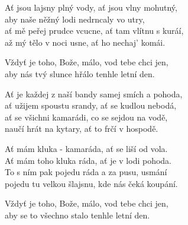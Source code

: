 
\ve{}
Ať jsou lajsny plný vody, ať jsou vlny mohutný,\\
aby naše něžný lodi nedrncaly vo utry,\\
ať mě peřej prudce vcucne, ať tam vlítnu s kur{á}í,\\
až mý tělo v noci usne, ať ho nechaj' kom{á}i.

\cho{}
Vždyť je toho, Bože, málo, vod tebe chci jen,\\
aby nás tvý slunce hřálo tenhle letní den.

\ve{}
Ať je každej z naší bandy samej smích a pohoda,\\
ať užijem spoustu srandy, ať se kudlou nebodá,\\
ať se všichni kamarádi, co se sejdou na vodě,\\
naučí hrát na kytary, ať to frčí v hospodě.

\cho{}

\ve{}
Ať mám kluka - kamaráda, ať se liší od vola.\\
Ať mám toho kluka ráda, ať je v lodi pohoda.\\
To s ním pak pojedu ráda a za pusu, usmání\\
pojedu tu velkou šlajsnu, kde nás čeká koupání.

\cho{}

\re{}
Vždyť je toho, Bože, málo, vod tebe chci jen,\\
aby se to všechno stalo tenhle letní den.

\esong{}